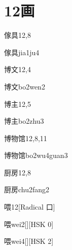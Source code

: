 
\section*{12画}

\begin{entry}{傢具}{12,8}
  \begin{phonetics}{傢具}{jia1ju4}
  \end{phonetics}
\end{entry}

\begin{entry}{博文}{12,4}
  \begin{phonetics}{博文}{bo2wen2}
  \end{phonetics}
\end{entry}

\begin{entry}{博主}{12,5}
  \begin{phonetics}{博主}{bo2zhu3}
  \end{phonetics}
\end{entry}

\begin{entry}{博物馆}{12,8,11}
  \begin{phonetics}{博物馆}{bo2wu4guan3}
  \end{phonetics}
\end{entry}

\begin{entry}{厨房}{12,8}
  \begin{phonetics}{厨房}{chu2fang2}
  \end{phonetics}
\end{entry}

\begin{entry}{喂}{12}[Radical 口]
  \begin{phonetics}{喂}{wei2}[][HSK 0]
  \end{phonetics}
  \begin{phonetics}{喂}{wei4}[][HSK 2]
  \end{phonetics}
\end{entry}

